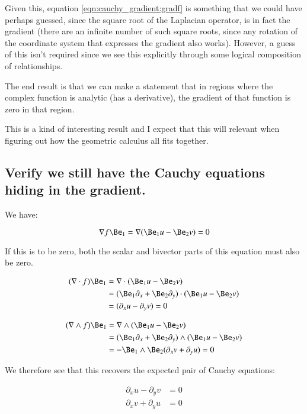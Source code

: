 Given this, equation \ref{eqn:cauchy_gradient:gradf} is something that we could have perhaps guessed, since the square root of the Laplacian operator, is in fact the gradient (there are an infinite number of such square roots, since any rotation of the coordinate system that expresses the gradient also works).  However, a guess of this isn't required since we see this explicitly through some logical composition of relationships.

The end result is that we can make a statement that
in regions where the complex function is analytic (has a derivative), the gradient of that function is zero in that region.

This is a kind of interesting result and I expect that this will relevant when figuring out how the geometric calculus
all fits together.

\subsection{Verify we still have the Cauchy equations hiding in the gradient. }

We have:

\begin{equation*}
\grad f \Be_1 = \grad ( \Be_1 u - \Be_2 v) = 0
\end{equation*}

If this is to be zero, both the scalar and bivector parts of this equation must also be zero.

\begin{align*}
(\grad \cdot f) \Be_1
&= \grad \cdot ( \Be_1 u - \Be_2 v) \\
&= (\Be_1 \partial_x + \Be_2 \partial_y) \cdot ( \Be_1 u - \Be_2 v) \\
&= (\partial_x u - \partial_y v) = 0
\end{align*}

\begin{align*}
(\grad \wedge f) \Be_1
&= \grad \wedge ( \Be_1 u - \Be_2 v) \\
&= (\Be_1 \partial_x + \Be_2 \partial_y) \wedge ( \Be_1 u - \Be_2 v) \\
&= -\Be_1 \wedge \Be_2 (\partial_x v + \partial_y u) = 0
\end{align*}

We therefore see that this recovers the expected pair of Cauchy equations:

\begin{align*}
\partial_x u - \partial_y v &= 0 \\
\partial_x v + \partial_y u &= 0
\end{align*}
